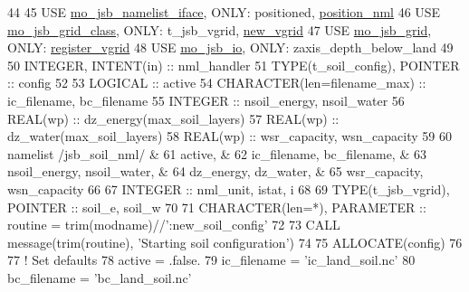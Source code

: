 \begin{DoxyCode}
44 
45     \textcolor{keywordtype}{USE }\hyperlink{namespacemo__jsb__namelist__iface}{mo\_jsb\_namelist\_iface}\textcolor{keywordtype}{, ONLY}: positioned, 
      \hyperlink{namespacemo__jsb__namelist__iface_a4d29dc192b429a0c5f11ecd7d7f637e9}{position\_nml}
46     \textcolor{keywordtype}{USE }\hyperlink{namespacemo__jsb__grid__class}{mo\_jsb\_grid\_class}\textcolor{keywordtype}{,     ONLY}: t\_jsb\_vgrid, \hyperlink{namespacemo__jsb__grid__class_a9b97575796bec8269c7381e0ffedd2d8}{new\_vgrid}
47     \textcolor{keywordtype}{USE }\hyperlink{namespacemo__jsb__grid}{mo\_jsb\_grid}\textcolor{keywordtype}{,           ONLY}: \hyperlink{namespacemo__jsb__grid_a043909fe2d80d058e59831341f25fdab}{register\_vgrid}
48     \textcolor{keywordtype}{USE }\hyperlink{namespacemo__jsb__io}{mo\_jsb\_io}\textcolor{keywordtype}{,             ONLY}: zaxis\_depth\_below\_land
49 
50     \textcolor{keywordtype}{INTEGER},          \textcolor{keywordtype}{INTENT(in)} :: nml\_handler
51     \textcolor{keywordtype}{TYPE}(t\_soil\_config), \textcolor{keywordtype}{POINTER} :: config
52 
53     \textcolor{keywordtype}{LOGICAL}  :: active
54     \textcolor{keywordtype}{CHARACTER(len=filename\_max)} :: ic\_filename, bc\_filename
55     \textcolor{keywordtype}{INTEGER}  :: nsoil\_energy, nsoil\_water
56     \textcolor{keywordtype}{REAL(wp)} :: dz\_energy(max\_soil\_layers)
57     \textcolor{keywordtype}{REAL(wp)} :: dz\_water(max\_soil\_layers)
58     \textcolor{keywordtype}{REAL(wp)} :: wsr\_capacity, wsn\_capacity
59 
60     namelist /jsb\_soil\_nml/                     &
61       active,                                   &
62       ic\_filename, bc\_filename,                 &
63       nsoil\_energy, nsoil\_water,                &
64       dz\_energy, dz\_water,                      &
65       wsr\_capacity, wsn\_capacity
66 
67     \textcolor{keywordtype}{INTEGER} :: nml\_unit, istat, i
68 
69     \textcolor{keywordtype}{TYPE}(t\_jsb\_vgrid), \textcolor{keywordtype}{POINTER} :: soil\_e, soil\_w
70 
71     \textcolor{keywordtype}{CHARACTER(len=*)}, \textcolor{keywordtype}{PARAMETER} :: routine = trim(modname)//\textcolor{stringliteral}{':new\_soil\_config'}
72 
73     \textcolor{keyword}{CALL }message(trim(routine), \textcolor{stringliteral}{'Starting soil configuration'})
74 
75     \textcolor{keyword}{ALLOCATE}(config)
76 
77     \textcolor{comment}{! Set defaults}
78     active         = .false.
79     ic\_filename    = \textcolor{stringliteral}{'ic\_land\_soil.nc'}
80     bc\_filename    = \textcolor{stringliteral}{'bc\_land\_soil.nc'}

\end{DoxyCode}
